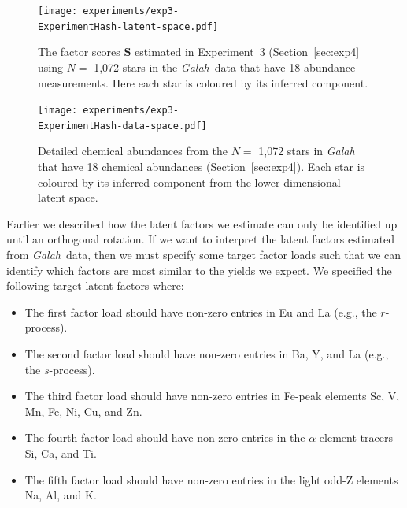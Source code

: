 \documentclass[twocolumn]{aastex62}
\newcommand{\project}[1]{\textsl{#1}}
\newcommand{\Galah}{\project{Galah}}
\newcommand{\factorscores}{\textbf{S}}
\newcommand{\ExperimentHash}{89dab}
\begin{document}
\begin{figure}
	\texttt{[image: experiments/exp3-\\ExperimentHash-latent-space.pdf]}
	\caption{The factor scores $\factorscores$ estimated in Experiment~3 (Section~\ref{sec:exp4} using $N =$ 1,072 stars in the \Galah\ data \citep{Buder:2018} that have 18 abundance measurements. Here each star is coloured by its inferred component.}
    \label{fig:exp3-latent-space}
\end{figure}


\begin{figure}
	\texttt{[image: experiments/exp3-\\ExperimentHash-data-space.pdf]}
	\caption{Detailed chemical abundances from the $N =$ 1,072 stars in \Galah\ \citep{Buder:2018} that have 18 chemical abundances (Section~\ref{sec:exp4}). Each star is coloured by its inferred component from the lower-dimensional latent space.}
    \label{fig:exp3-data-space}
\end{figure}

Earlier we described how the latent factors we estimate can only be identified up until an orthogonal rotation. If we want to interpret the latent factors estimated from \Galah\ data, then we must specify
some target factor loads such that we can identify which factors are most similar to the yields we expect.
We specified the following target latent factors where:
\begin{itemize}
	\item The first factor load should have non-zero entries in Eu and La (e.g., the $r$-process).
	\item The second factor load should have non-zero entries in Ba, Y, and La (e.g., the $s$-process).
	\item The third factor load should have non-zero entries in Fe-peak elements Sc, V, Mn, Fe, Ni, Cu, and Zn.
	\item The fourth factor load should have non-zero entries in the $\alpha$-element tracers Si, Ca, and Ti.
	\item The fifth factor load should have non-zero entries in the light odd-Z elements Na, Al, and K.
\end{itemize}
\end{document}
